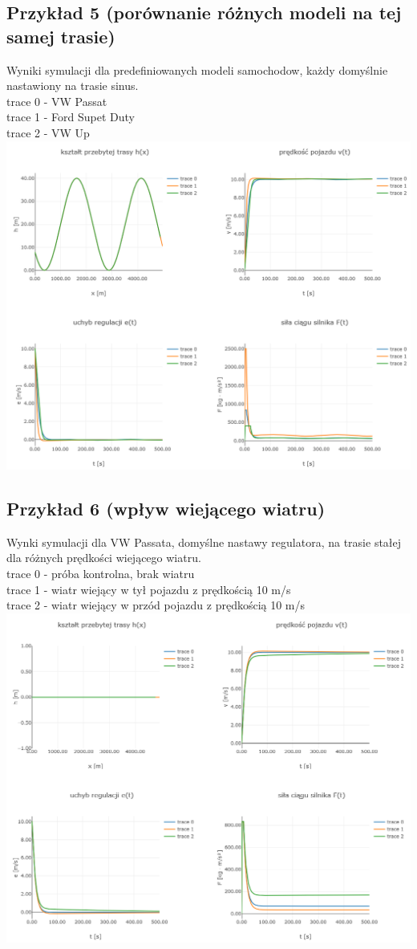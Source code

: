 \documentclass[12pt,a4paper]{article}
\begin{document}
	\subsection{Przykład 5 (porównanie różnych modeli na tej samej trasie)}
	Wyniki symulacji dla predefiniowanych modeli samochodow, każdy domyślnie nastawiony na trasie sinus. \\
	trace 0 - VW Passat \\
	trace 1 - Ford Supet Duty \\
	trace 2 - VW Up \\
	
	\includegraphics[width=0.9\linewidth]{"zrzut 5.png"}
	\newpage
	\subsection{Przykład 6 (wpływ wiejącego wiatru)}
	Wynki symulacji dla VW Passata, domyślne nastawy regulatora, na trasie stałej dla różnych prędkości wiejącego wiatru. \\
	trace 0 - próba kontrolna, brak wiatru \\
	trace 1 - wiatr wiejący w tył pojazdu z prędkością 10 m/s \\
	trace 2 - wiatr wiejący w przód pojazdu z prędkością 10 m/s \\
	
	\includegraphics[width=0.9\linewidth]{"zrzut 6.png"}
\end{document}
